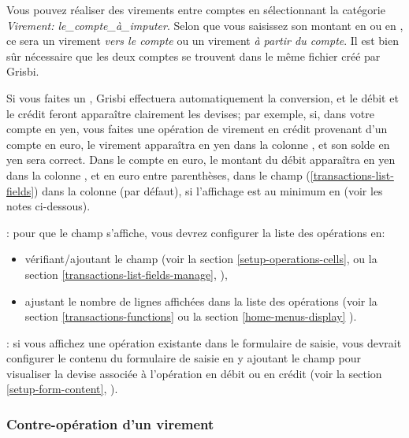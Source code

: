 Vous pouvez réaliser des virements entre comptes en sélectionnant la catégorie \emph{Virement: le\_compte\_à\_imputer}. Selon que vous saisissez son montant en  ou en , ce sera un virement \emph{vers le compte} ou un virement \emph{à partir du compte}. Il est bien sûr nécessaire que les deux comptes se trouvent dans le même fichier créé par Grisbi.

Si vous faites un , Grisbi effectuera automatiquement la conversion, et le débit et le crédit feront apparaître clairement les devises; par exemple, si, dans votre compte en yen, vous faites une opération de virement en crédit provenant d'un compte en euro, le virement apparaîtra en yen dans la colonne , et son solde en yen sera correct. Dans le compte en euro, le montant du débit apparaîtra en yen dans la colonne , et en euro entre parenthèses, dans le champ  (\vref{transactions-list-fields}) dans la colonne  (par défaut), si l'affichage est au minimum en  (voir les notes ci-dessous).

\noindent
\Note{}: pour que le champ  s'affiche, vous devrez configurer la liste des opérations en:
	\begin{itemize}
		\item vérifiant/ajoutant le champ  (voir la section \vref{setup-operations-cells},  ou la section \vref{transactions-list-fields-manage}, ), 
		\item ajustant le nombre de lignes affichées dans la liste des opérations (voir la section \vref{transactions-functions}  ou la section \vref{home-menus-display} ).
	\end{itemize}

\Note{}: si vous affichez une opération existante dans le formulaire de saisie, vous devrait configurer le contenu du formulaire de saisie en y ajoutant le champ  pour visualiser la devise associée à l'opération en débit ou en crédit (voir la section \vref{setup-form-content}, ).


\subsubsection{Contre-opération d'un virement\label{transactions-new-transfer-associatedOperation}}

